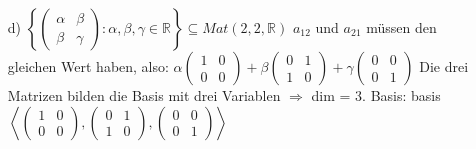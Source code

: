 \documentclass{article}
\begin{document}
\begin{enumerate}
        \item[d)]
        $\left\{\left(\begin{array}{cc}\alpha&\beta\\\beta&\gamma\end{array}\right)
        :\alpha,\beta,\gamma\in\mathbb{R}\right\}\subseteq Mat(2,2,\mathbb{R})$
        \newline
        $a_{12}$ und $a_{21}$ müssen den gleichen Wert haben, also:
        \newline
        $\alpha\left(\begin{array}{cc}1&0\\0&0\end{array}\right)+
        \beta\left(\begin{array}{cc}0&1\\1&0\end{array}\right)+
        \gamma\left(\begin{array}{cc}0&0\\0&1\end{array}\right)$
        \newline
        Die drei Matrizen bilden die Basis mit drei Variablen $\Rightarrow$ dim = 3. 
        \newline
        Basis: basis$\left<\left(\begin{array}{cc}1&0\\0&0\end{array}\right),
        \left(\begin{array}{cc}0&1\\1&0\end{array}\right),
        \left(\begin{array}{cc}0&0\\0&1\end{array}\right)\right>$


\end{enumerate}
\end{document}
